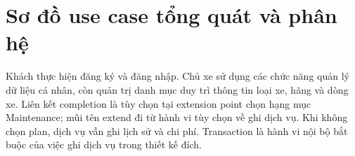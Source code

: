 \section{Sơ đồ use case tổng quát và phân hệ}
Khách thực hiện đăng ký và đăng nhập. Chủ xe sử dụng các chức năng quản lý dữ liệu cá nhân, còn quản trị danh mục duy trì thông tin loại xe, hãng và dòng xe.
Liên kết completion là tùy chọn tại extension point chọn hạng mục Maintenance; mũi tên extend đi từ hành vi tùy chọn về ghi dịch vụ. Khi không chọn plan, dịch vụ vẫn ghi lịch sử và chi phí. Transaction là hành vi nội bộ bắt buộc của việc ghi dịch vụ trong thiết kế đích.

